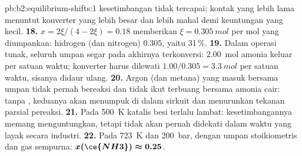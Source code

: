 \begin{solution}{pb:b2:equilibrium-shifts:1}
kesetimbangan tidak tercapai; kontak yang lebih lama menuntut konverter
yang lebih besar dan lebih mahal demi keuntungan yang kecil.
\textbf{18.} $x = 2\xi/(4 - 2\xi) = 0.18$ memberikan $\xi = \qty{0.305}{mol}$
per mol  yang diumpankan:  hidrogen (dan
nitrogen) $0.305$, yaitu 31\,\%.
\textbf{19.} Dalam operasi tunak, seluruh umpan segar pada akhirnya
terkonversi: \qty{2.00}{mol} amonia keluar per satuan waktu; konverter
harus dilewati $1.00/
0.305 = \qty{3.3}{mol}$  per satuan waktu,
sisanya didaur ulang.
\textbf{20.} Argon (dan metana) yang masuk bersama umpan tidak pernah
bereaksi dan tidak ikut terbuang bersama amonia cair: tanpa , keduanya
akan menumpuk di dalam sirkuit dan menurunkan tekanan parsial pereaksi.
\textbf{21.} Pada \qty{500}{K} katalis besi terlalu lambat: kesetimbangannya
memang menguntungkan, tetapi tidak akan pernah didekati dalam waktu yang
layak secara industri.
\textbf{22.} Pada \qty{723}{K} dan \qty{200}{bar}, dengan umpan
stoikiometris dan gas sempurna: $\boldsymbol{x(\ce{NH3}) \approx 0.25}$.
\end{solution}
